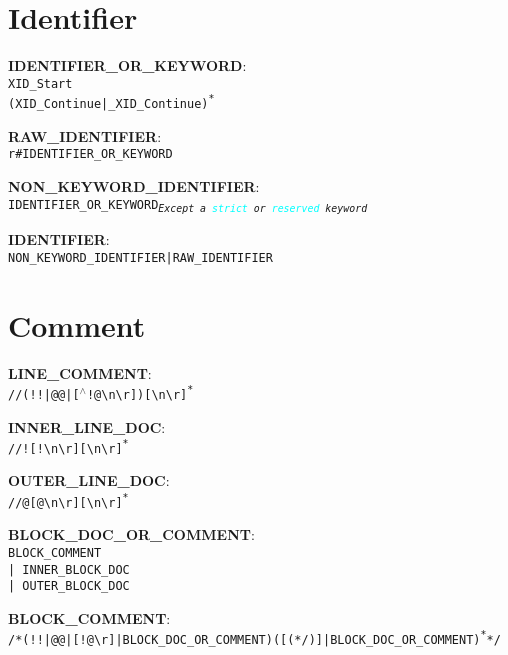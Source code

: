 \documentclass[12pt, letterpaper]{article}
\newcommand*{\tab}{\texttt{\hspace*{1cm}}}
\newcommand*{\esc}[1]{\texttt{\textbackslash #1}}
\newcommand*{\gap}{\texttt{\hspace{2pt}}}
\begin{document}
\section{Identifier}

\noindent
\textbf{IDENTIFIER\_OR\_KEYWORD}: \\
\tab \texttt{XID\_Start} \\
\tab \texttt{(XID\_Continue\gap{}|\gap{}\_XID\_Continue)\textsuperscript{*}}

\noindent
\textbf{RAW\_IDENTIFIER}: \\
\tab \texttt{r\#IDENTIFIER\_OR\_KEYWORD}

\noindent
\textbf{NON\_KEYWORD\_IDENTIFIER}: \\ 
\tab \texttt{IDENTIFIER\_OR\_KEYWORD\textsubscript{\textit{Except a \textcolor{cyan}{strict} or \textcolor{cyan}{reserved} keyword}}}

\noindent
\textbf{IDENTIFIER}: \\ 
\tab \texttt{NON\_KEYWORD\_IDENTIFIER\gap{}|\gap{}RAW\_IDENTIFIER}

\section{Comment}

\noindent
\textbf{LINE\_COMMENT}: \\ 
\tab \texttt{//(!!\gap{}|\gap{}@@\gap{}|\gap{}[$^\wedge$!@\esc{n}\esc{r}])[\bm{$^\wedge$}\esc{n}\esc{r}]\textsuperscript{*}}

\noindent
\textbf{INNER\_LINE\_DOC}: \\ 
\tab \texttt{//![\bm{$^\wedge$}!\esc{n}\esc{r}][\bm{$^\wedge$}\esc{n}\esc{r}]\textsuperscript{*}}

\noindent
\textbf{OUTER\_LINE\_DOC}: \\ 
\tab \texttt{//@[\bm{$^\wedge$}@\esc{n}\esc{r}][\bm{$^\wedge$}\esc{n}\esc{r}]\textsuperscript{*}}

\noindent
\textbf{BLOCK\_DOC\_OR\_COMMENT}: \\
\tab \texttt{BLOCK\_COMMENT} \\
\tab \texttt{| INNER\_BLOCK\_DOC} \\
\tab \texttt{| OUTER\_BLOCK\_DOC}

\noindent
\textbf{BLOCK\_COMMENT}: \\
\tab \texttt{/*(!!\gap{}|\gap{}@@\gap{}|\gap{}[\bm{$^\wedge$}!@\esc{r}]\gap{}|\gap{}BLOCK\_DOC\_OR\_COMMENT)([\bm{$^\wedge$}(*/)]\gap{}|\gap{}BLOCK\_DOC\_OR\_COMMENT)\textsuperscript{*}*/}
\end{document}
